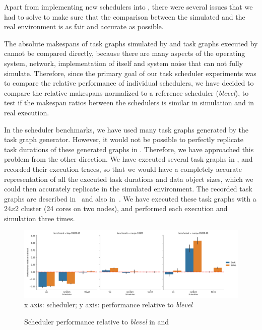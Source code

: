 Apart from implementing new schedulers into \dask{}, there were several issues that
we had to solve to make sure that the comparison between the simulated and the real environment is
as fair and accurate as possible.

The absolute makespans of task graphs simulated by \estee{} and task graphs executed
by \dask{} cannot be compared directly, because there are many aspects of the
operating system, network, implementation of \dask{} itself and system noise that
\estee{} can not fully simulate. Therefore, since the primary goal of our task
scheduler experiments was to compare the relative performance of individual schedulers, we have
decided to compare the relative makespans normalized to a reference scheduler
(\emph{blevel}), to test if the makespan ratios between the schedulers is similar in
simulation and in real execution.

In the scheduler benchmarks, we have used many task graphs generated by the \estee{}
task graph generator. However, it would not be possible to perfectly replicate task durations of
these generated graphs in \dask{}. Therefore, we have approached this problem from
the other direction. We have executed several task graphs in \dask{}, and recorded
their execution traces, so that we would have a completely accurate representation of all the
executed task durations and data object sizes, which we could then accurately replicate in the
simulated \estee{} environment. The recorded task graphs are described
in~ and also in~\cite{rsds}. We have executed these task graphs
with a $24x2$ cluster (24 cores on two nodes), and performed each execution and
simulation three times.

\begin{figure}
	\centering
	\includegraphics[width=\textwidth]{imgs/estee/charts/estee-validation}\\
	{\small x axis: scheduler; y axis: performance relative to \emph{blevel}}
	\caption{Scheduler performance relative to \emph{blevel} in \dask{} and \estee}
	\label{fig:estee-validation}
\end{figure}

